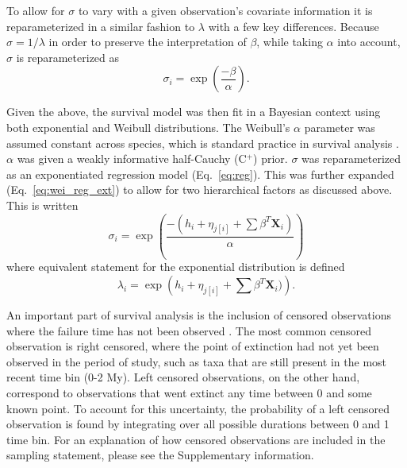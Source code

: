 \documentclass{pnastwo}
\begin{document}
\begin{article}
\begin{materials}
To allow for \(\sigma\) to vary with a given observation's covariate information it is reparameterized in a similar fashion to \(\lambda\) with a few key differences. Because \(\sigma = 1/\lambda\) in order to preserve the interpretation of \(\beta\), while taking \(\alpha\) into account, \(\sigma\) is reparameterized as
\begin{equation}
  \sigma_{i} = \exp\left(\frac{-\beta}{\alpha}\right).
  \label{eq:reg}
\end{equation}

Given the above, the survival model was then fit in a Bayesian context using both exponential and Weibull distributions. The Weibull's \(\alpha\) parameter was assumed constant across species, which is standard practice in survival analysis \cite{Klein2003}. \(\alpha\) was given a weakly informative half-Cauchy (C\(^{+}\)) prior. \(\sigma\) was reparameterized as an exponentiated regression model (Eq.~\ref{eq:reg}). This was further expanded (Eq.~\ref{eq:wei_reg_ext}) to allow for two hierarchical factors as discussed above. This is written
\begin{equation}
  \sigma_{i} = \exp\left(\frac{-(h_{i} + \eta_{j[i]} + \sum \beta^{T} \mathbf{X}_{i})}{\alpha}\right)
  \label{eq:wei_reg_ext}
\end{equation}
where equivalent statement for the exponential distribution is defined
\begin{equation}
  \lambda_{i} = \exp\left(h_{i} + \eta_{j[i]} + \sum \beta^{T} \mathbf{X}_{i})\right).
  \label{eq:exp_reg_ext}
\end{equation}

An important part of survival analysis is the inclusion of censored observations where the failure time has not been observed \cite{Ibrahim2001,Klein2003}. The most common censored observation is right censored, where the point of extinction had not yet been observed in the period of study, such as taxa that are still present in the most recent time bin (0-2 My). Left censored observations, on the other hand, correspond to observations that went extinct any time between 0 and some known point. To account for this uncertainty, the probability of a left censored observation is found by integrating over all possible durations between 0 and 1 time bin. For an explanation of how censored observations are included in the sampling statement, please see the Supplementary information.



\end{materials}
\end{article}
\end{document}
